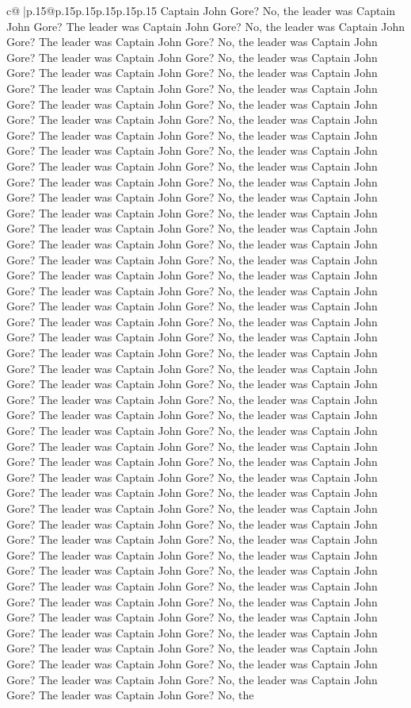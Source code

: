 \documentclass{article}
\begin{document}
{\begin{supertabular}{c@{$\;$}|p{.15\linewidth}@{}p{.15\linewidth}p{.15\linewidth}p{.15\linewidth}p{.15\linewidth}p{.15\linewidth}}
{{{Captain John Gore? No, the leader was Captain John Gore? The leader was Captain John Gore? No, the leader was Captain John Gore? The leader was Captain John Gore? No, the leader was Captain John Gore? The leader was Captain John Gore? No, the leader was Captain John Gore? The leader was Captain John Gore? No, the leader was Captain John Gore? The leader was Captain John Gore? No, the leader was Captain John Gore? The leader was Captain John Gore? No, the leader was Captain John Gore? The leader was Captain John Gore? No, the leader was Captain John Gore? The leader was Captain John Gore? No, the leader was Captain John Gore? The leader was Captain John Gore? No, the leader was Captain John Gore? The leader was Captain John Gore? No, the leader was Captain John Gore? The leader was Captain John Gore? No, the leader was Captain John Gore? The leader was Captain John Gore? No, the leader was Captain John Gore? The leader was Captain John Gore? No, the leader was Captain John Gore? The leader was Captain John Gore? No, the leader was Captain John Gore? The leader was Captain John Gore? No, the leader was Captain John Gore? The leader was Captain John Gore? No, the leader was Captain John Gore? The leader was Captain John Gore? No, the leader was Captain John Gore? The leader was Captain John Gore? No, the leader was Captain John Gore? The leader was Captain John Gore? No, the leader was Captain John Gore? The leader was Captain John Gore? No, the leader was Captain John Gore? The leader was Captain John Gore? No, the leader was Captain John Gore? The leader was Captain John Gore? No, the leader was Captain John Gore? The leader was Captain John Gore? No, the leader was Captain John Gore? The leader was Captain John Gore? No, the leader was Captain John Gore? The leader was Captain John Gore? No, the leader was Captain John Gore? The leader was Captain John Gore? No, the leader was Captain John Gore? The leader was Captain John Gore? No, the leader was Captain John Gore? The leader was Captain John Gore? No, the leader was Captain John Gore? The leader was Captain John Gore? No, the leader was Captain John Gore? The leader was Captain John Gore? No, the leader was Captain John Gore? The leader was Captain John Gore? No, the leader was Captain John Gore? The leader was Captain John Gore? No, the leader was Captain John Gore? The leader was Captain John Gore? No, the leader was Captain John Gore? The leader was Captain John Gore? No, the leader was Captain John Gore? The leader was Captain John Gore? No, the leader was Captain John Gore? The leader was Captain John Gore? No, the leader was Captain John Gore? The leader was Captain John Gore? No, the leader was Captain John Gore? The leader was Captain John Gore? No, the leader was Captain John Gore? The leader was Captain John Gore? No, the leader was Captain John Gore? The leader was Captain John Gore? No, the leader was Captain John Gore? The leader was Captain John Gore? No, the leader was Captain John Gore? The leader was Captain John Gore? No, the leader was Captain John Gore? The leader was Captain John Gore? No, the leader was Captain John Gore? The leader was Captain John Gore? No, the }}}
\end{supertabular}}
\end{document}
